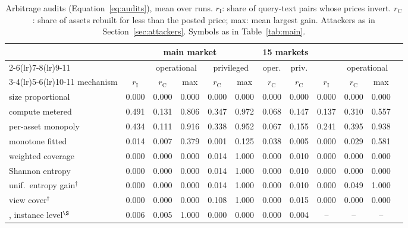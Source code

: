 
\begin{table}[t]
  \centering
  \footnotesize
  \setlength{\tabcolsep}{4pt}
  \caption{Arbitrage audits (Equation~\eqref{eq:audits}), mean over runs. $r_{\mathrm{I}}$: share of query-text pairs whose prices invert. $r_{\mathrm{C}}$: share of assets rebuilt for less than the posted price; max: mean largest gain. Attackers as in Section~\ref{sec:attackers}. Symbols as in Table~\ref{tab:main}.}
  \label{tab:audits}
  \begin{tabular}{@{}lccccccccccc@{}}
    \toprule
    & \multicolumn{5}{c}{\sqlshare{} main market} & \multicolumn{2}{c}{15 markets} & \multicolumn{3}{c}{\tpch{}} \\
    \cmidrule(lr){2-6}\cmidrule(lr){7-8}\cmidrule(lr){9-11}
    & & \multicolumn{2}{c}{operational} & \multicolumn{2}{c}{privileged} & oper. & priv. & & \multicolumn{2}{c}{operational} \\
    \cmidrule(lr){3-4}\cmidrule(lr){5-6}\cmidrule(lr){10-11}
    mechanism & $r_{\mathrm{I}}$ & $r_{\mathrm{C}}$ & max & $r_{\mathrm{C}}$ & max & $r_{\mathrm{C}}$ & $r_{\mathrm{C}}$ & $r_{\mathrm{I}}$ & $r_{\mathrm{C}}$ & max \\
    \midrule
    size proportional & 0.000 & 0.000 & 0.000 & 0.000 & 0.000 & 0.000 & 0.000 & 0.000 & 0.000 & 0.000 \\
    compute metered & 0.491 & 0.131 & 0.806 & 0.347 & 0.972 & 0.068 & 0.147 & 0.137 & 0.310 & 0.557 \\
    per-asset monopoly & 0.434 & 0.111 & 0.916 & 0.338 & 0.952 & 0.067 & 0.155 & 0.241 & 0.395 & 0.938 \\
    monotone fitted & 0.014 & 0.007 & 0.379 & 0.001 & 0.125 & 0.038 & 0.005 & 0.000 & 0.029 & 0.581 \\
    \midrule
    \qirana{} weighted coverage & 0.000 & 0.000 & 0.000 & 0.014 & 1.000 & 0.000 & 0.010 & 0.000 & 0.000 & 0.000 \\
    \qirana{} Shannon entropy & 0.000 & 0.000 & 0.000 & 0.014 & 1.000 & 0.000 & 0.010 & 0.000 & 0.000 & 0.000 \\
    \qirana{} unif.\ entropy gain$^{\ddagger}$ & 0.000 & 0.000 & 0.000 & 0.014 & 1.000 & 0.000 & 0.010 & 0.000 & 0.049 & 1.000 \\
    \querymarket{} view cover$^{\dagger}$ & 0.000 & 0.000 & 0.000 & 0.108 & 1.000 & 0.000 & 0.015 & 0.000 & 0.000 & 0.000 \\
    \querymarket{}, instance level$^{\S}$ & 0.006 & 0.005 & 1.000 & 0.000 & 0.000 & 0.000 & 0.004 & -- & -- & -- \\

\end{tabular}
\end{table}
